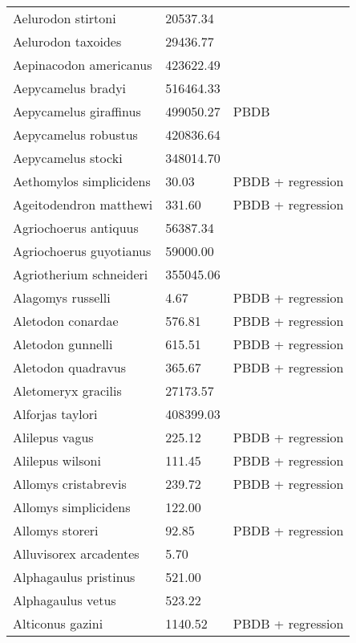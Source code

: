 \documentclass{article}
\begin{document}
\begin{center}
\begin{longtable}{p{} p{} p{}}
    Aelurodon stirtoni & 20537.34 & \cite{Tomiya2013} \\ 
    Aelurodon taxoides & 29436.77 & \cite{Tomiya2013} \\ 
    Aepinacodon americanus & 423622.49 & \cite{Baskin2011} \\ 
    Aepycamelus bradyi & 516464.33 & \cite{Dawson2012} \\ 
    Aepycamelus giraffinus & 499050.27 & PBDB \\ 
    Aepycamelus robustus & 420836.64 & \cite{Tomiya2013} \\ 
    Aepycamelus stocki & 348014.70 & \cite{Tomiya2013} \\ 
    Aethomylos simplicidens & 30.03 & PBDB + regression \\ 
    Ageitodendron matthewi & 331.60 & PBDB + regression \\ 
    Agriochoerus antiquus & 56387.34 & \cite{Tomiya2013} \\ 
    Agriochoerus guyotianus & 59000.00 & \cite{McKenna2011} \\ 
    Agriotherium schneideri & 355045.06 & \cite{Tomiya2013} \\ 
    Alagomys russelli & 4.67 & PBDB + regression \\ 
    Aletodon conardae & 576.81 & PBDB + regression \\ 
    Aletodon gunnelli & 615.51 & PBDB + regression \\ 
    Aletodon quadravus & 365.67 & PBDB + regression \\ 
    Aletomeryx gracilis & 27173.57 & \cite{Tomiya2013} \\ 
    Alforjas taylori & 408399.03 & \cite{Tomiya2013} \\ 
    Alilepus vagus & 225.12 & PBDB + regression \\ 
    Alilepus wilsoni & 111.45 & PBDB + regression \\ 
    Allomys cristabrevis & 239.72 & PBDB + regression \\ 
    Allomys simplicidens & 122.00 & \cite{McKenna2011} \\ 
    Allomys storeri & 92.85 & PBDB + regression \\ 
    Alluvisorex arcadentes & 5.70 & \cite{Tomiya2013} \\ 
    Alphagaulus pristinus & 521.00 & \cite{McKenna2011} \\ 
    Alphagaulus vetus & 523.22 & \cite{Tomiya2013} \\ 
    Alticonus gazini & 1140.52 & PBDB + regression \\ 

\end{longtable}
\end{center}
\end{document}
